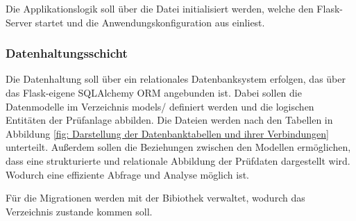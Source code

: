 Die Applikationslogik soll über die Datei  initialisiert werden, welche den Flask-Server startet und die Anwendungskonfiguration aus  einliest.


\subsubsection{Datenhaltungsschicht}

Die Datenhaltung soll über ein relationales Datenbanksystem erfolgen, das über das Flask-eigene SQLAlchemy \ac{ORM} angebunden ist.
Dabei sollen die Datenmodelle im Verzeichnis models/ definiert werden und die logischen Entitäten der Prüfanlage abbilden.
Die Dateien werden nach den Tabellen in Abbildung \ref{fig: Darstellung der Datenbanktabellen und ihrer Verbindungen} unterteilt.
Außerdem sollen die Beziehungen zwischen den Modellen ermöglichen, dass eine strukturierte und relationale Abbildung der Prüfdaten dargestellt wird.
Wodurch eine effiziente Abfrage und Analyse möglich ist.

Für die Migrationen werden mit der Bibiothek  verwaltet, wodurch das Verzeichnis  zustande kommen soll.






























